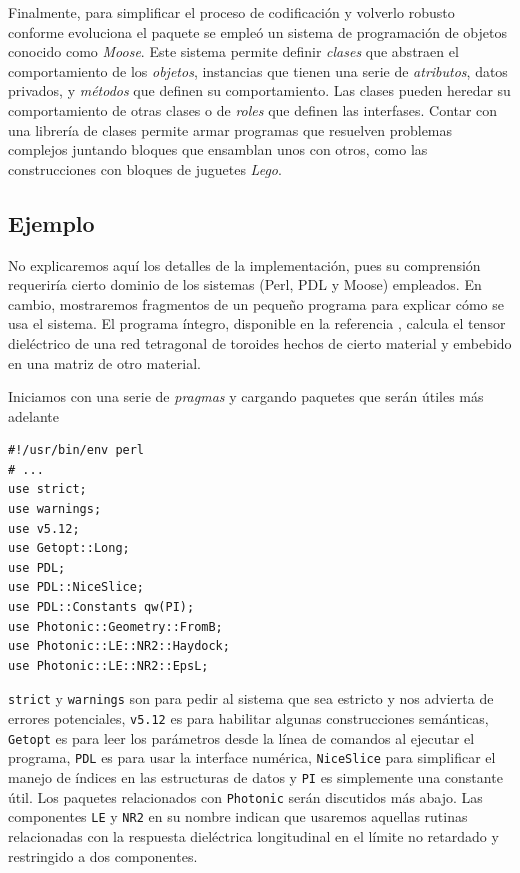 \documentclass[12pt]{article}
\begin{document}
Finalmente, para simplificar el proceso de codificación y volverlo
robusto conforme evoluciona el paquete se empleó un sistema de
programación de objetos conocido como {\em Moose}\cite{Moose}. Este
sistema permite definir {\em clases} que abstraen el comportamiento de
los {\em objetos}, instancias que tienen una serie de
{\em atributos}, datos privados, y {\em métodos} que definen su
comportamiento. Las clases pueden heredar su
comportamiento de otras clases o de {\em roles} que definen las
interfases. Contar con una librería de clases permite armar programas
que resuelven problemas complejos juntando bloques que ensamblan unos
con otros, como las construcciones con bloques de juguetes  {\em Lego}.

\subsection{Ejemplo}

No explicaremos aquí los detalles de la implementación, pues su
comprensión requeriría cierto dominio de los sistemas (Perl, PDL y
Moose) empleados. En cambio, mostraremos fragmentos de un pequeño
programa para explicar cómo se usa el sistema. El programa íntegro,
disponible en la referencia \cite{toroide}, calcula
el tensor dieléctrico de una red tetragonal de toroides hechos de cierto
material y embebido en una matriz de otro material.

Iniciamos con una serie de {\em pragmas} y cargando paquetes que serán
útiles más adelante
\begin{verbatim}
#!/usr/bin/env perl
# ...
use strict;
use warnings;
use v5.12;
use Getopt::Long;
use PDL;
use PDL::NiceSlice;
use PDL::Constants qw(PI);
use Photonic::Geometry::FromB;
use Photonic::LE::NR2::Haydock;
use Photonic::LE::NR2::EpsL;
\end{verbatim}
{\tt strict} y {\tt warnings}  son para pedir al sistema que sea estricto y nos advierta
de errores potenciales, {\tt v5.12} es para habilitar algunas
construcciones semánticas, {\tt Getopt} es para leer los parámetros
desde la línea de comandos al ejecutar el programa, {\tt PDL} es para usar la interface
numérica, {\tt NiceSlice} para simplificar el manejo de índices en las
estructuras de datos y {\tt PI} es simplemente una constante
útil. Los paquetes relacionados con {\tt Photonic} serán discutidos
más abajo. Las componentes {\tt LE} y {\tt NR2} en su nombre indican que usaremos
aquellas rutinas relacionadas con la respuesta dieléctrica
longitudinal en el límite no retardado y restringido a dos componentes.
\end{document}
